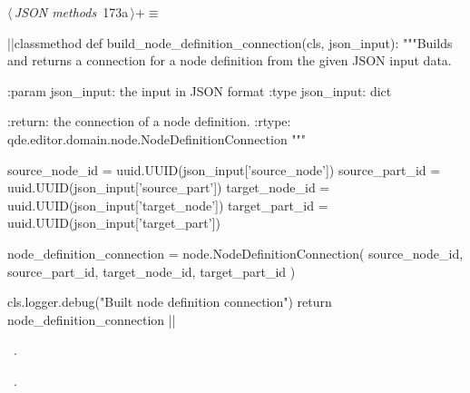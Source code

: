 \documentclass[%
    a4paper,    %
    justified,  %
    nobib,      %
    openany     %
]{tufte-book}
\begin{document}
\begin{flushleft} \small
\begin{minipage}{\linewidth}\label{scrap197}\raggedright\small
{} $\langle\,${\itshape JSON methods}\nobreak\ {\footnotesize {173a}}$\,\rangle+\equiv$
\vspace{-1ex}
\begin{pythoncode}
|\normalfont{}\fontfamily{}|classmethod
def build_node_definition_connection(cls, json_input):
    """Builds and returns a connection for a node definition from the given
    JSON input data.

    :param json_input: the input in JSON format
    :type  json_input: dict

    :return: the connection of a node definition.
    :rtype:  qde.editor.domain.node.NodeDefinitionConnection
    """

    source_node_id = uuid.UUID(json_input['source_node'])
    source_part_id = uuid.UUID(json_input['source_part'])
    target_node_id = uuid.UUID(json_input['target_node'])
    target_part_id = uuid.UUID(json_input['target_part'])

    node_definition_connection = node.NodeDefinitionConnection(
        source_node_id,
        source_part_id,
        target_node_id,
        target_part_id
    )

    cls.logger.debug("Built node definition connection")
    return node_definition_connection
|\NWsep|
\end{pythoncode}
\vspace{1.5ex}
\footnotesize
\begin{list}{}{\setlength{\itemsep}{-\parsep}\setlength{\itemindent}{-\leftmargin}}
\item \NWtxtMacroDefBy\ .
\item \NWtxtMacroRefIn\ .

\item{}
\end{list}
\end{minipage}\vspace{4ex}
\end{flushleft}
\end{document}
